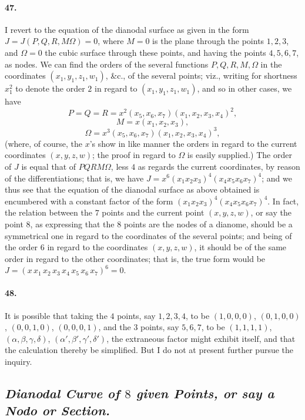 \documentclass[11pt,a4paper]{article}
\begin{document}
\paragraph{47.}
I revert to the equation of the dianodal surface as given in the form
$J = J(P, Q, R, M \Omega) = 0$, where $M = 0$ is the plane through the points $1, 2, 3$,
and $\Omega = 0$ the cubic surface through these points, and having the points $4, 5, 6, 7$,
as nodes. We can find the orders of the several functions $P, Q, R, M, \Omega$ in the
coordinates $(x_1, y_1, z_1, w_1)$, \&c., of the several points; viz., writing for shortness
$x_1^2$ to denote the order $2$ in regard to $(x_1, y_1, z_1, w_1)$, and so in other cases,
we have
\[
P = Q = R = x^2 (x_5, x_6, x_7)(x_1, x_2, x_3, x_4)^2,
\]
\[
M = x (x_1, x_2, x_3),
\]
\[
\Omega = x^3 (x_5, x_6, x_7)(x_1, x_2, x_3, x_4)^3,
\]
(where, of course, the $x$'s show in like manner the orders in regard to the current
coordinates $(x, y, z, w)$; the proof in regard to $\Omega$ is easily supplied.) The order
of $J$ is equal that of $P Q R M \Omega$, less $4$ as regards the current coordinates, by
reason of the differentiations; that is, we have
$J = x^6 (x_1 x_2 x_3)^4 (x_4 x_5 x_6 x_7)^4$; and we thus see that the equation of the
dianodal surface as above obtained is encumbered with a constant factor of the form
$(x_1 x_2 x_3)^4 (x_4 x_5 x_6 x_7)^4$. In fact, the relation between the $7$ points and
the current point $(x, y, z, w)$, or say the point $8$, as expressing that the $8$ points
are the nodes of a dianome, should be a symmetrical one in regard to the coordinates of the
several points; and being of the order $6$ in regard to the coordinates $(x, y, z, w)$,
it should be of the same order in regard to the other coordinates; that is, the true form
would be $J = (x\, x_1\, x_2\, x_3\, x_4\, x_5\, x_6\, x_7)^6 = 0$.

\paragraph{48.}
It is possible that taking the $4$ points, say $1, 2, 3, 4$, to be $(1, 0, 0, 0)$,
$(0, 1, 0, 0)$, $(0, 0, 1, 0)$, $(0, 0, 0, 1)$, and the $3$ points, say $5, 6, 7$, to be
$(1, 1, 1, 1)$, $(\alpha, \beta, \gamma, \delta)$, $(\alpha', \beta', \gamma', \delta')$,
the extraneous factor might exhibit itself, and that the calculation thereby be simplified.
But I do not at present further pursue the inquiry.

\bigskip

\subsection*{\textit{Dianodal Curve of $8$ given Points, or say a Nodo or Section.}}
\end{document}
